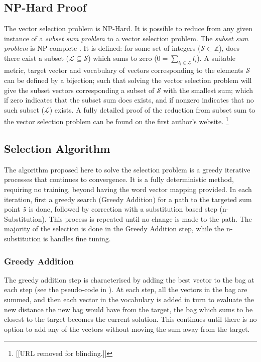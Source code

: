 \documentclass{llncs}
\begin{document}
\subsection{NP-Hard Proof}
The vector selection problem is NP-Hard. It is possible to reduce from any given instance of a \emph{subset sum problem} to a vector selection problem. The \emph{subset sum problem} is NP-complete \parencite{karp1972reducibility}. It is defined: for some set of integers ($\mathcal{S}\subset\mathbb{Z}$), does there exist a subset ($\mathcal{L}\subseteq\mathcal{S}$) which sums to zero ($0=\sum_{l_i\in \mathcal{L}} l_i$).  A suitable metric, target vector and  vocabulary of vectors corresponding to the elements $\mathcal{S}$ can be defined by a bijection; such that solving the vector selection problem will give the subset vectors corresponding a subset of $\mathcal{S}$ with the smallest sum; which if zero indicates that the subset sum does exists, and if nonzero indicates that no such subset ($\mathcal{L}$) exists. A fully detailed proof of the reduction from subset sum to the vector selection problem can be found on the first author's website. \footnote{[[URL removed for blinding.]]}

\subsection{Selection Algorithm}
The algorithm proposed here to solve the selection problem is a greedy iterative processes that continues to convergence. It is a fully deterministic method, requiring no training, beyond having the word vector mapping provided. In each iteration, first a greedy search (Greedy Addition) for a path to the targeted sum point $\tilde{s}$ is done, followed by correction with a substitution based step (n-Substitution). This process is repeated until no change is made to the path. The majority of the selection is done in the Greedy Addition step, while the n-substitution is handles fine tuning. 

\subsubsection{Greedy Addition}
The greedy addition step is characterised by adding the best vector to the bag at each step (see the pseudo-code in ). At each step, all the vectors in the bag are summed, and then each vector in the vocabulary is added in turn to evaluate the new distance the new bag would have from the target, the bag which sums to be closest to the target  becomes the current solution. This continues until there is no option to add any of the vectors without moving the sum away from the target.
\end{document}
